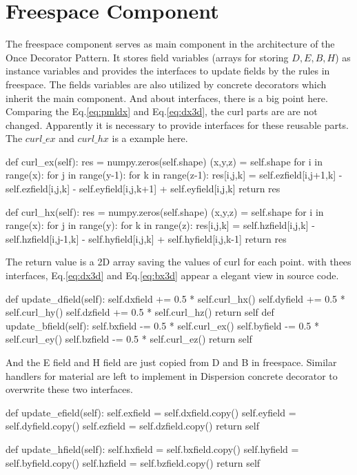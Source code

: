 \section{Freespace Component}
The freespace component serves as main component in the architecture of the Once Decorator Pattern. It stores field
variables (arrays for storing $D, E, B, H$) as instance variables and provides the interfaces to update fields by the
rules in freespace. The fields variables are also utilized by concrete decorators which inherit the main component. And
about interfaces, there is a big point here. Comparing the Eq.\ref{eq:pmldx} and Eq.\ref{eq:dx3d}, the curl parts are
are not changed. Apparently it is necessary to provide interfaces for these reusable parts. The $curl\_ex$ and
$curl\_hx$ is a example here.
\begin{code}
    def curl_ex(self):
        res = numpy.zeros(self.shape)
        (x,y,z) = self.shape
        for i in range(x):
            for j in range(y-1):
                for k in range(z-1):
                    res[i,j,k] = self.ezfield[i,j+1,k] - self.ezfield[i,j,k] 
                               - self.eyfield[i,j,k+1] + self.eyfield[i,j,k]
        return res

    def curl_hx(self):
        res = numpy.zeros(self.shape)
        (x,y,z) = self.shape
        for i in range(x):
            for j in range(y):
                for k in range(z):
                    res[i,j,k] = self.hzfield[i,j,k] - self.hzfield[i,j-1,k] 
                               - self.hyfield[i,j,k] + self.hyfield[i,j,k-1]
        return res
\end{code}
The return value is a 2D array saving the values of curl for each point. with thees interfaces, Eq.\ref{eq:dx3d} and
Eq.\ref{eq:bx3d} appear a elegant view in source code.
\begin{code}
    def update_dfield(self):
        self.dxfield += 0.5 * self.curl_hx()
        self.dyfield += 0.5 * self.curl_hy()
        self.dzfield += 0.5 * self.curl_hz()
        return self
    def update_bfield(self):
        self.bxfield -= 0.5 * self.curl_ex()
        self.byfield -= 0.5 * self.curl_ey()
        self.bzfield -= 0.5 * self.curl_ez()
        return self
\end{code}
And the E field and H field are just copied from D and B in freespace. Similar handlers for material are left to
implement in Dispersion concrete decorator to overwrite these two interfaces.
\begin{code}
    def update_efield(self):
        self.exfield = self.dxfield.copy()
        self.eyfield = self.dyfield.copy()
        self.ezfield = self.dzfield.copy()
        return self

    def update_hfield(self):
        self.hxfield = self.bxfield.copy()
        self.hyfield = self.byfield.copy()
        self.hzfield = self.bzfield.copy()
        return self
\end{code}


